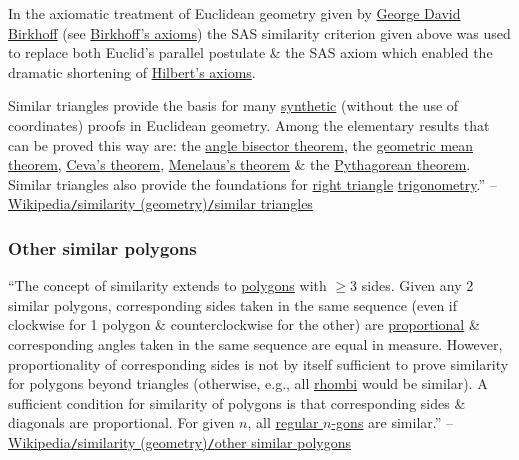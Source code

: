 \documentclass{article}
\begin{document}
In the axiomatic treatment of Euclidean geometry given by \href{https://en.wikipedia.org/wiki/George_David_Birkhoff}{George David Birkhoff} (see \href{https://en.wikipedia.org/wiki/Birkhoff%27s_axioms}{Birkhoff's axioms}) the SAS similarity criterion given above was used to replace both Euclid's parallel postulate \& the SAS axiom which enabled the dramatic shortening of \href{https://en.wikipedia.org/wiki/Hilbert%27s_axioms}{Hilbert's axioms}.

Similar triangles provide the basis for many \href{https://en.wikipedia.org/wiki/Synthetic_geometry}{synthetic} (without the use of coordinates) proofs in Euclidean geometry. Among the elementary results that can be proved this way are: the \href{https://en.wikipedia.org/wiki/Angle_bisector_theorem}{angle bisector theorem}, the \href{https://en.wikipedia.org/wiki/Geometric_mean_theorem}{geometric mean theorem}, \href{https://en.wikipedia.org/wiki/Ceva%27s_theorem}{Ceva's theorem}, \href{https://en.wikipedia.org/wiki/Menelaus%27s_theorem}{Menelaus's theorem} \& the \href{https://en.wikipedia.org/wiki/Pythagorean_theorem}{Pythagorean theorem}. Similar triangles also provide the foundations for \href{https://en.wikipedia.org/wiki/Trigonometry}{right triangle} \href{https://en.wikipedia.org/wiki/Trigonometry}{trigonometry}.'' -- \href{https://en.wikipedia.org/wiki/Similarity_(geometry)#Similar_triangles}{Wikipedia\texttt{/}similarity (geometry)\texttt{/}similar triangles}

\subsubsection{Other similar polygons}
``The concept of similarity extends to \href{https://en.wikipedia.org/wiki/Polygon}{polygons} with $\ge3$ sides. Given any 2 similar polygons, corresponding sides taken in the same sequence (even if clockwise for 1 polygon \& counterclockwise for the other) are \href{https://en.wikipedia.org/wiki/Proportionality_(mathematics)}{proportional} \& corresponding angles taken in the same sequence are equal in measure. However, proportionality of corresponding sides is not by itself sufficient to prove similarity for polygons beyond triangles (otherwise, e.g., all \href{https://en.wikipedia.org/wiki/Rhombus}{rhombi} would be similar). A sufficient condition for similarity of polygons is that corresponding sides \& diagonals are proportional. For given $n$, all \href{https://en.wikipedia.org/wiki/Regular_polygon}{regular $n$-gons} are similar.'' -- \href{https://en.wikipedia.org/wiki/Similarity_(geometry)#Other_similar_polygons}{Wikipedia\texttt{/}similarity (geometry)\texttt{/}other similar polygons}
\end{document}
